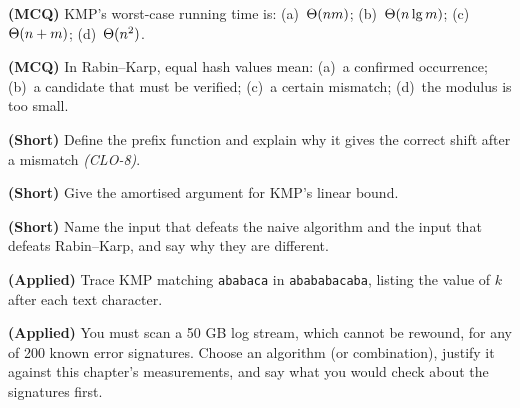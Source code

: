 \begin{reviewq}
  \item \textbf{(MCQ)} KMP's worst-case running time is: (a)~$\Theta(nm)$;
        (b)~$\Theta(n\operatorname{lg} m)$; (c)~$\Theta(n+m)$; (d)~$\Theta(n^{2})$.
  \item \textbf{(MCQ)} In Rabin--Karp, equal hash values mean:
        (a)~a confirmed occurrence; (b)~a candidate that must be verified;
        (c)~a certain mismatch; (d)~the modulus is too small.
  \item \textbf{(Short)} Define the prefix function and explain why it gives
        the correct shift after a mismatch \emph{(CLO-8)}.
  \item \textbf{(Short)} Give the amortised argument for KMP's linear bound.
  \item \textbf{(Short)} Name the input that defeats the naive algorithm and
        the input that defeats Rabin--Karp, and say why they are different.
  \item \textbf{(Applied)} Trace KMP matching \texttt{ababaca} in
        \texttt{abababacaba}, listing the value of $k$ after each text
        character.
  \item \textbf{(Applied)} You must scan a 50 GB log stream, which cannot be
        rewound, for any of 200 known error signatures. Choose an algorithm (or
        combination), justify it against this chapter's measurements, and say
        what you would check about the signatures first.
\end{reviewq}
